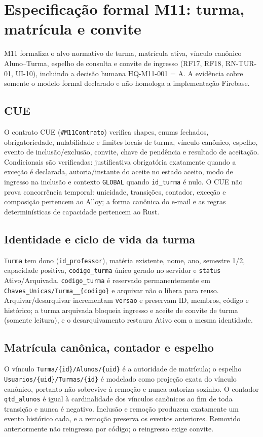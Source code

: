 \clearpage
\section{Especificação formal M11: turma, matrícula e convite}
\label{sec:formal-m11}
\sloppy

M11 formaliza o alvo normativo de turma, matrícula ativa, vínculo canônico
Aluno--Turma, espelho de consulta e convite de ingresso (RF17, RF18, RN-TUR-01,
UI-10), incluindo a decisão humana HQ-M11-001 = A. A evidência cobre somente o
modelo formal declarado e não homologa a implementação Firebase.

\subsection*{CUE}
O contrato CUE (\texttt{\#M11Contrato}) verifica shapes, enums fechados,
obrigatoriedade, nulabilidade e limites locais de turma, vínculo canônico,
espelho, evento de inclusão/exclusão, convite, chave de pendência e resultado de
aceitação. Condicionais são verificadas: justificativa obrigatória exatamente
quando a exceção é declarada, autoria/instante do aceite no estado aceito, modo
de ingresso na inclusão e contexto \texttt{GLOBAL} quando \texttt{id\_turma} é
nulo. O CUE não prova concorrência temporal: unicidade, transições, contador,
exceção e composição pertencem ao Alloy; a forma canônica do e-mail e as regras
determinísticas de capacidade pertencem ao Rust.

\subsection*{Identidade e ciclo de vida da turma}
\texttt{Turma} tem dono (\texttt{id\_professor}), matéria existente, nome, ano,
semestre 1/2, capacidade positiva, \texttt{codigo\_turma} único gerado no
servidor e \texttt{status} Ativo/Arquivada. \texttt{codigo\_turma} é reservado
permanentemente em \texttt{Chaves\_Unicas/Turma\_\_\{codigo\}} e arquivar não o
libera para reuso. Arquivar/desarquivar incrementam \texttt{versao} e preservam
ID, membros, código e histórico; a turma arquivada bloqueia ingresso e aceite de
convite de turma (somente leitura), e o desarquivamento restaura Ativo com a
mesma identidade.

\subsection*{Matrícula canônica, contador e espelho}
O vínculo \texttt{Turma/\{id\}/Alunos/\{uid\}} é a autoridade de matrícula; o
espelho \texttt{Usuarios/\{uid\}/Turmas/\{id\}} é modelado como projeção exata
do vínculo canônico, portanto não sobrevive à remoção e nunca autoriza sozinho.
O contador \texttt{qtd\_alunos} é igual à cardinalidade dos vínculos canônicos
ao fim de toda transição e nunca é negativo. Inclusão e remoção produzem
exatamente um evento histórico cada, e a remoção preserva os eventos anteriores.
Removido anteriormente não reingressa por código; o reingresso exige convite.

